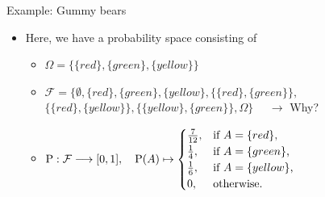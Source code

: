 \documentclass[a4,11pt]{beamer}
\newlength{\wideitemsep}
\let\olditem\item
\renewcommand{\item}{\setlength{\itemsep}{\wideitemsep}\olditem}
\begin{document}
{
\begin{frame}{Example: Gummy bears}

    \begin{itemize}
        \item Here, we have a probability space consisting of\medskip\\
        \begin{itemize}
            \item $\Omega=\big\{\{red\},\{green\},\{yellow\}\big\}$
            \item $\mathcal{F}=\bigg\{\emptyset,\{red\},\{green\},\{yellow\},\big\{\{red\},\{green\}\big\},$\\\hspace{1cm}$\big\{\{red\},\{yellow\}\big\},\big\{\{yellow\},\{green\}\big\},\Omega\bigg\}$ \textcolor{blueberry}{$\quad\rightarrow$ Why?}
            \item $\operatorname{P}:\mathcal{F}\longrightarrow [0,1],\quad \operatorname{P}(A)\mapsto\begin{cases}
                \frac{7}{12},&\text{if $A=\{red\}$,}\\
                \frac{1}{4},&\text{if $A=\{green\}$,}\\
                \frac{1}{6},&\text{if $A=\{yellow\}$,}\\
                0,&\text{otherwise.}
            \end{cases}$
        \end{itemize}
    \end{itemize}
    
\end{frame}
}
\end{document}
